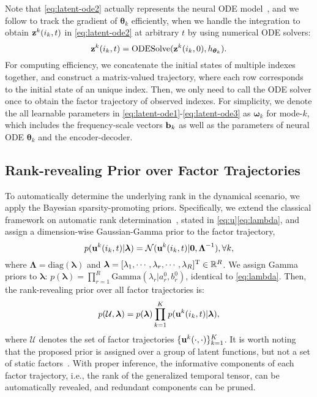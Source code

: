  Note that \eqref{eq:latent-ode2} actually represents the neural ODE model~\citep{Tenenbaum_Pollard_ode, chen2018neural}, and we  follow \citet{chen2018neural} to track the gradient of $\boldsymbol{\theta}_k$ efficiently, when we handle the integration to obtain $\mathbf{z}^k(i_k,t)$ in \eqref{eq:latent-ode2} at arbitrary $t$ by using numerical ODE solvers:
 \vspace{-2mm}
 \begin{equation}
    \mathbf{z}^k(i_k,t) =  \text{ODESolve}(\mathbf{z}^k(i_k,0),h_{\boldsymbol{\theta}_k}).
\end{equation}
For computing efficiency, we  concatenate the initial states of multiple indexes together, and construct a matrix-valued trajectory, where each row corresponds to the initial state of an unique index. Then, we only need to call the ODE solver once to obtain the factor trajectory of observed indexes. For simplicity, we denote the all learnable parameters in \eqref{eq:latent-ode1}-\eqref{eq:latent-ode3} as $\boldsymbol{\omega}_k$ for mode-$k$, which includes the frequency-scale vectors $\mathbf{b}_k$ as well as the parameters of neural ODE $\boldsymbol{\theta}_k$ and the encoder-decoder.


\subsection{Rank-revealing Prior over Factor Trajectories}
To automatically determine the underlying rank in the dynamical scenario, we apply the Bayesian sparsity-promoting priors. Specifically, we extend the classical framework on automatic rank determination~\citep{zhao2015bayesianCP}, stated in \eqref{eq:u}\eqref{eq:lambda}, and assign  a dimension-wise Gaussian-Gamma prior to the factor trajectory,
\vspace{-2mm}
\begin{equation}
    p(\mathbf{u}^{k}(i_k,t)|\boldsymbol{\lambda}) = \mathcal{N}(\mathbf{u}^{k}(i_k,t)|\boldsymbol{0}, \boldsymbol{\Lambda}^{-1}), \forall k,
\end{equation}
where $\boldsymbol{\Lambda} = \text{diag}(\boldsymbol{\lambda})$ and $\boldsymbol{\lambda}=[\lambda_1, \cdots, \lambda_r, \cdots, \lambda_R]^{\mathrm{T}} \in \mathbb{R}^{R}$. We assign Gamma priors to $\boldsymbol{\lambda}$: $p(\boldsymbol{\lambda}) = \prod_{r=1}^{R} \text{Gamma}(\lambda_r|a_r^0, b_r^0)$, identical to \eqref{eq:lambda}. Then, the rank-revealing prior over all factor trajectories is:
\vspace{-2mm}
\begin{equation}
    p(\mathcal{U}, \boldsymbol{\lambda}) = p(\boldsymbol{\lambda}) \prod_{k=1}^K p(\mathbf{u}^{k}(i_k,t)|\boldsymbol{\lambda}), \label{eq:ODE_prior} 
\end{equation}
where $\mathcal{U}$ denotes the set of  factor trajectories $\{\mathbf{u}^{k}(\cdot,\cdot)\}_{k=1}^{K}$.
It is worth noting that the proposed prior is assigned over a group of latent functions, but not a set of static factors~\citep{zhao2015bayesianCP}. With proper inference, the informative components of each factor trajectory, i.e., the rank of the generalized temporal tensor, can be automatically revealed, and redundant components can be pruned.  


